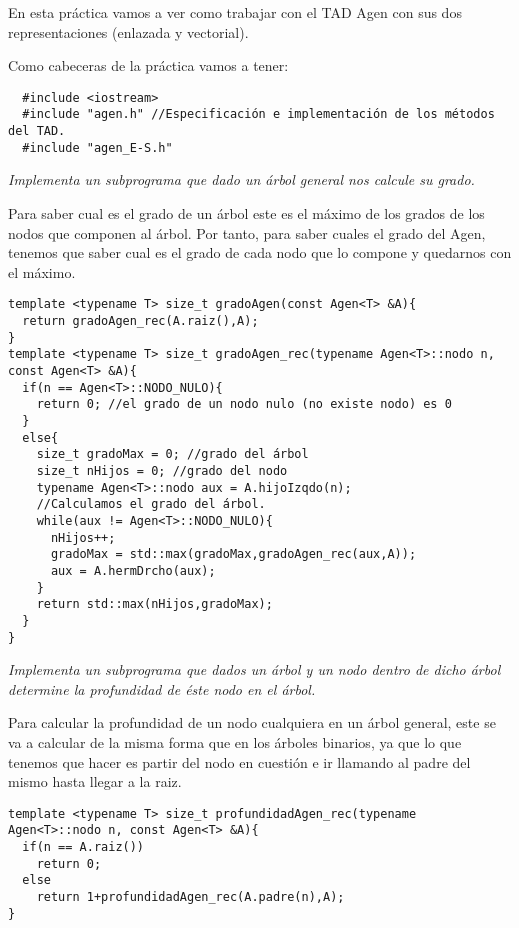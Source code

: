 En esta práctica vamos a ver como trabajar con el TAD Agen con sus dos representaciones (enlazada y vectorial).

Como cabeceras de la práctica vamos a tener:
\begin{verbatim}
  #include <iostream>
  #include "agen.h" //Especificación e implementación de los métodos del TAD.
  #include "agen_E-S.h"
\end{verbatim}

\textbf{\large{}}\textit{ Implementa un subprograma que dado un árbol general nos calcule su grado.}

Para saber cual es el grado de un árbol este es el máximo de los grados de los nodos que componen al árbol.
Por tanto, para saber cuales el grado del Agen, tenemos que saber cual es el grado de cada nodo que lo compone y quedarnos con el máximo.

\begin{verbatim}
template <typename T> size_t gradoAgen(const Agen<T> &A){
  return gradoAgen_rec(A.raiz(),A);
}
template <typename T> size_t gradoAgen_rec(typename Agen<T>::nodo n, const Agen<T> &A){
  if(n == Agen<T>::NODO_NULO){
    return 0; //el grado de un nodo nulo (no existe nodo) es 0
  }
  else{
    size_t gradoMax = 0; //grado del árbol
    size_t nHijos = 0; //grado del nodo
    typename Agen<T>::nodo aux = A.hijoIzqdo(n);
    //Calculamos el grado del árbol.
    while(aux != Agen<T>::NODO_NULO){
      nHijos++;
      gradoMax = std::max(gradoMax,gradoAgen_rec(aux,A));
      aux = A.hermDrcho(aux);
    }
    return std::max(nHijos,gradoMax);
  }
}
\end{verbatim}

\textbf{\large{}}\textit{ Implementa un subprograma que dados un árbol y un nodo dentro de dicho árbol determine la profundidad de éste nodo en el árbol.}

Para calcular la profundidad de un nodo cualquiera en un árbol general, este se va a calcular de la misma forma que en los árboles binarios, ya que lo que tenemos que hacer es partir del nodo en cuestión e ir llamando al padre del mismo hasta llegar a la raiz.

\begin{verbatim}
template <typename T> size_t profundidadAgen_rec(typename Agen<T>::nodo n, const Agen<T> &A){
  if(n == A.raiz())
    return 0;
  else
    return 1+profundidadAgen_rec(A.padre(n),A);
}
\end{verbatim}

